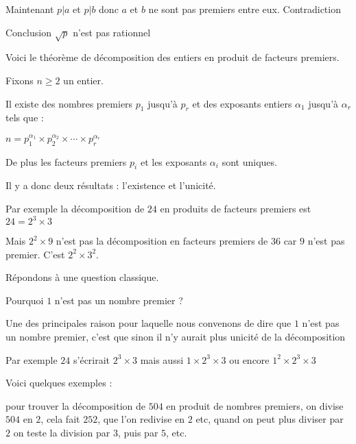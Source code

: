 \change

 Maintenant $p|a$ et $p|b$ donc $a$ et $b$ ne sont pas premiers entre eux. Contradiction

\change 

Conclusion $\sqrt p$ n'est pas rationnel


\diapo

Voici le théorème de décomposition des entiers en produit de facteurs premiers.

Fixons $n\ge 2$ un entier.

Il existe des nombres premiers $p_1$ jusqu'à $p_r$
et des exposants entiers $\alpha_1$ jusqu'à $\alpha_r$ tels que :

$n = p_1^{\alpha_1} \times p_2^{\alpha_2} \times \cdots \times p_r^{\alpha_r}$

\change

De plus les facteurs premiers $p_i$ et les exposants $\alpha_i$ sont uniques.


\change

Il y a donc deux résultats : l'existence et l'unicité.

\change

Par exemple la décomposition de $24$ en produits de facteurs premiers est $24 = 2^3 \times 3$

\change 

Mais $2^2 \times 9$ n'est pas la décomposition en facteurs premiers de $36$ car 
$9$ n'est pas premier. C'est $2^2\times 3^2$.

\change

Répondons à une question classique.

Pourquoi $1$ n'est pas un nombre premier ?

\change

Une des principales raison pour laquelle nous convenons de dire
que $1$ n'est pas un nombre premier, c'est que sinon 
il n'y aurait plus unicité de la décomposition 

\change

Par exemple $24$ s'écrirait $2^3 \times 3$ mais aussi $1 \times 2^3 \times 3$ 
ou encore $1^2 \times 2^3 \times 3$


\diapo

Voici quelques exemples :

pour trouver la décomposition de $504$ en produit de nombres premiers, on divise $504$
en $2$, cela fait $252$, que l'on redivise en $2$ etc, quand on peut plus diviser par $2$ on 
teste la division par $3$, puis par $5$, etc.

